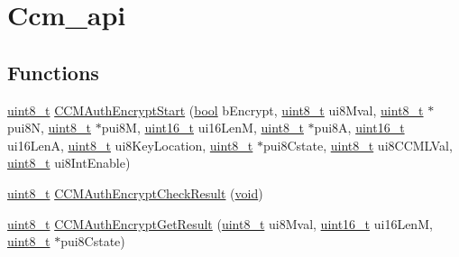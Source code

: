 \hypertarget{group__ccm__api}{}\section{Ccm\+\_\+api}
\label{group__ccm__api}
\subsection*{Functions}
\begin{DoxyCompactItemize}
\item 
\hyperlink{_p_e___types_8h_aba7bc1797add20fe3efdf37ced1182c5}{uint8\+\_\+t} \hyperlink{group__ccm__api_ga2c1571572fa394a21ab75cc815d3d1a2}{C\+C\+M\+Auth\+Encrypt\+Start} (\hyperlink{_p_e___types_8h_a97a80ca1602ebf2303258971a2c938e2}{bool} b\+Encrypt, \hyperlink{_p_e___types_8h_aba7bc1797add20fe3efdf37ced1182c5}{uint8\+\_\+t} ui8\+Mval, \hyperlink{_p_e___types_8h_aba7bc1797add20fe3efdf37ced1182c5}{uint8\+\_\+t} $\ast$pui8N, \hyperlink{_p_e___types_8h_aba7bc1797add20fe3efdf37ced1182c5}{uint8\+\_\+t} $\ast$pui8M, \hyperlink{_p_e___types_8h_a1f1825b69244eb3ad2c7165ddc99c956}{uint16\+\_\+t} ui16\+LenM, \hyperlink{_p_e___types_8h_aba7bc1797add20fe3efdf37ced1182c5}{uint8\+\_\+t} $\ast$pui8A, \hyperlink{_p_e___types_8h_a1f1825b69244eb3ad2c7165ddc99c956}{uint16\+\_\+t} ui16\+LenA, \hyperlink{_p_e___types_8h_aba7bc1797add20fe3efdf37ced1182c5}{uint8\+\_\+t} ui8\+Key\+Location, \hyperlink{_p_e___types_8h_aba7bc1797add20fe3efdf37ced1182c5}{uint8\+\_\+t} $\ast$pui8\+Cstate, \hyperlink{_p_e___types_8h_aba7bc1797add20fe3efdf37ced1182c5}{uint8\+\_\+t} ui8\+C\+C\+M\+L\+Val, \hyperlink{_p_e___types_8h_aba7bc1797add20fe3efdf37ced1182c5}{uint8\+\_\+t} ui8\+Int\+Enable)
\item 
\hyperlink{_p_e___types_8h_aba7bc1797add20fe3efdf37ced1182c5}{uint8\+\_\+t} \hyperlink{group__ccm__api_gacaf434bff8e6a00e761a346c6e6ab1c5}{C\+C\+M\+Auth\+Encrypt\+Check\+Result} (\hyperlink{usb__devapi_8h_afabf60e7f57651d6d595a02c75f07cd0}{void})
\item 
\hyperlink{_p_e___types_8h_aba7bc1797add20fe3efdf37ced1182c5}{uint8\+\_\+t} \hyperlink{group__ccm__api_gaffe3d2787b64707252b6fcf9a1f7fbd4}{C\+C\+M\+Auth\+Encrypt\+Get\+Result} (\hyperlink{_p_e___types_8h_aba7bc1797add20fe3efdf37ced1182c5}{uint8\+\_\+t} ui8\+Mval, \hyperlink{_p_e___types_8h_a1f1825b69244eb3ad2c7165ddc99c956}{uint16\+\_\+t} ui16\+LenM, \hyperlink{_p_e___types_8h_aba7bc1797add20fe3efdf37ced1182c5}{uint8\+\_\+t} $\ast$pui8\+Cstate)
\item 

\end{DoxyCompactItemize}
